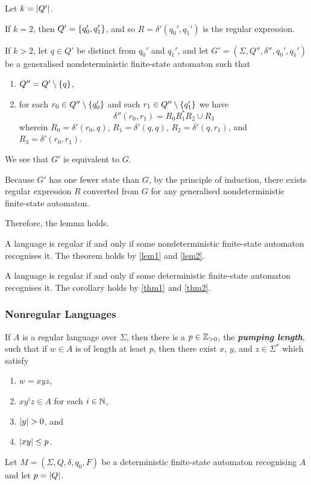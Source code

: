     Let \(k = \lvert Q'\rvert\).

    If \(k = 2\), then \(Q' = \{q_0', q_1'\}\), and so \(R = \delta'(q_0',
    q_1')\) is the regular expression.

    If \(k > 2\), let \(q \in Q'\) be distinct from \(q_0'\) and \(q_1'\), and
    let \(G' = (\Sigma, Q'', \delta'', q_0', q_1')\) be a generalised
    nondeterministic finite-state automaton such that
    \begin{enumerate}
        \item \(Q'' = Q' \setminus \{q\}\),
        \item for each \(r_0 \in Q'' \setminus \{q_0'\}\) and each \(r_1 \in
        Q'' \setminus \{q_1'\}\) we have
        \[
            \delta''(r_0, r_1) = R_0 R_1^* R_2 \cup R_3
        \]
        wherein \(R_0 = \delta'(r_0, q)\), \(R_1 = \delta'(q, q)\), \(R_2 =
        \delta'(q, r_1)\), and \(R_3 = \delta'(r_0, r_1)\).
    \end{enumerate}
    We see that \(G'\) is equivalent to \(G\).

    Because \(G'\) has one fewer state than \(G\), by the principle of
    induction, there exists regular expression \(R\) converted from \(G\) for
    any generalised nondeterministic finite-state automaton.

    Therefore, the lemma holds.
\Epr

\Bth
    \label{thm2}
    A language is regular if and only if some nondeterministic finite-state
    automaton recognises it.
\Eth
\Bpr
    The theorem holds by \autoref{lem1} and \autoref{lem2}.
\Epr

\Bcr
    A language is regular if and only if some deterministic finite-state
    automaton recognises it.
\Ecr
\Bpr
    The corollary holds by \autoref{thm1} and \autoref{thm2}.
\Epr

\subsubsection{Nonregular Languages}

    If \(A\) is a regular language over \(\Sigma\), then there is a \(p \in
    \mathbb{Z}_{>0}\), the \textbf{\textit{pumping length}}, such that if \(w \in A\) is
    of length at least \(p\), then there exist \(x\), \(y\), and \(z \in
    \Sigma^*\) which satisfy
    \begin{enumerate}
        \item \(w = x y z\),
        \item \(x y^i z \in A\) for each \(i \in \mathbb{N}\),
        \item \(\lvert y\rvert > 0\), and
        \item \(\lvert x y \rvert \leq p\).
    \end{enumerate}
\Eth
\Bpr
    Let \(M = (\Sigma, Q, \delta, q_0, F)\) be a deterministic finite-state
    automaton recognising \(A\) and let \(p = \lvert Q\rvert\).

